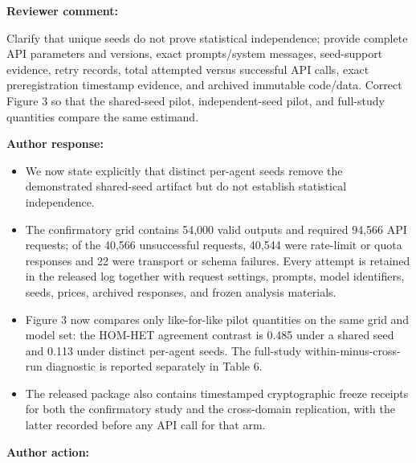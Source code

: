 \documentclass[11pt]{article}
\newcommand{\rvcomment}[1]{{\color{ReviewerGreen}#1}}
\newcommand{\concern}[1]{\textbf{\color{ReviewerGreen}#1}}
\begin{document}
\concern{Reviewer comment:}

\rvcomment{Clarify that unique seeds do not prove statistical independence; provide complete API parameters and versions, exact prompts/system messages, seed-support evidence, retry records, total attempted versus successful API calls, exact preregistration timestamp evidence, and archived immutable code/data. Correct Figure 3 so that the shared-seed pilot, independent-seed pilot, and full-study quantities compare the same estimand.}

\textbf{Author response:}

\begin{itemize}

\item We now state explicitly that distinct per-agent seeds remove the demonstrated shared-seed artifact but do not establish statistical independence.

\item The confirmatory grid contains 54,000 valid outputs and required 94,566 API requests; of the 40,566 unsuccessful requests, 40,544 were rate-limit or quota responses and 22 were transport or schema failures. Every attempt is retained in the released log together with request settings, prompts, model identifiers, seeds, prices, archived responses, and frozen analysis materials.

\item Figure 3 now compares only like-for-like pilot quantities on the same grid and model set: the HOM-HET agreement contrast is 0.485 under a shared seed and 0.113 under distinct per-agent seeds. The full-study within-minus-cross-run diagnostic is reported separately in Table 6.

\item The released package also contains timestamped cryptographic freeze receipts for both the confirmatory study and the cross-domain replication, with the latter recorded before any API call for that arm.

\end{itemize}

\textbf{Author action:}
\end{document}
